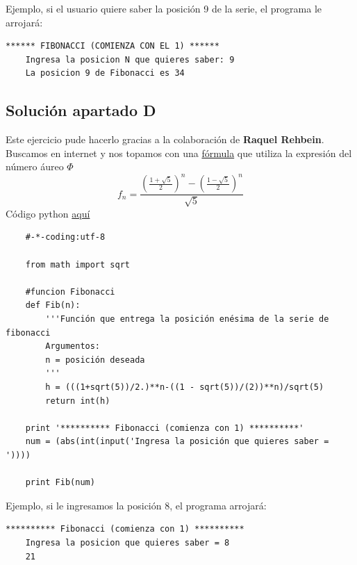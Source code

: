 \documentclass{article}
\begin{document}
    \noindent
    Ejemplo, si el usuario quiere saber la posición 9 de la serie, el programa le arrojará: 
    \begin{lstlisting}[style=C,numbers=none]
    ****** FIBONACCI (COMIENZA CON EL 1) ******
    Ingresa la posicion N que quieres saber: 9
    La posicion 9 de Fibonacci es 34
    \end{lstlisting}
    

\subsection{Solución apartado D}
Este ejercicio pude hacerlo gracias a la colaboración de \textbf{Raquel Rehbein}. Buscamos en internet y nos topamos con una \href{https://quantdare.com/numeros-de-fibonacci/}{fórmula} que utiliza la expresión del número áureo $\Phi$
\begin{equation*}
    f_n = \frac{\left(\frac{1+ \sqrt{5}}{2}\right)^{n}-\left(\frac{1-\sqrt{5}}{2}\right)^n}{\sqrt{5}}
\end{equation*}
Código python \href{https://github.com/joescalona/Programacion-Astronomica/blob/master/Tarea\%205/problema3_D.py}{aquí}
    \begin{verbatim}
    #-*-coding:utf-8 

    from math import sqrt 
    
    #funcion Fibonacci
    def Fib(n):
    	'''Función que entrega la posición enésima de la serie de fibonacci
    	Argumentos: 
    	n = posición deseada
    	'''
    	h = (((1+sqrt(5))/2.)**n-((1 - sqrt(5))/(2))**n)/sqrt(5)
    	return int(h) 
    
    print '********** Fibonacci (comienza con 1) **********'
    num = (abs(int(input('Ingresa la posición que quieres saber = '))))
    
    print Fib(num)
    \end{verbatim}
    
    \noindent
    Ejemplo, si le ingresamos la posición 8, el programa arrojará:
    
    \begin{lstlisting}[style=C,numbers=none]
    ********** Fibonacci (comienza con 1) **********
    Ingresa la posicion que quieres saber = 8
    21
    \end{lstlisting}

\end{document}
